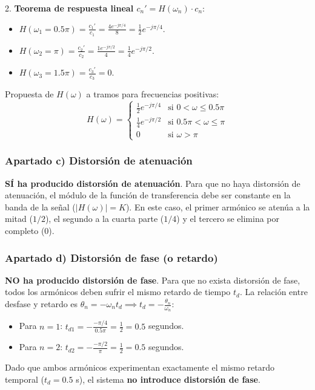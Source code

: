 \begin{resolucion}
2. \textbf{Teorema de respuesta lineal $c_n' = H(\omega_n) \cdot c_n$}:
   \begin{itemize}
       \item $H(\omega_1 = 0.5\pi) = \frac{c_1'}{c_1} = \frac{4 e^{-j\pi/4}}{8} = \frac{1}{2} e^{-j\pi/4}$.
       \item $H(\omega_2 = \pi) = \frac{c_2'}{c_2} = \frac{1 e^{-j\pi/2}}{4} = \frac{1}{4} e^{-j\pi/2}$.
       \item $H(\omega_3 = 1.5\pi) = \frac{c_3'}{c_3} = 0$.
   \end{itemize}

Propuesta de $H(\omega)$ a tramos para frecuencias positivas:
\[
H(\omega) = \begin{cases} 
\frac{1}{2} e^{-j\pi/4} & \text{si } 0 < \omega \le 0.5\pi \\
\frac{1}{4} e^{-j\pi/2} & \text{si } 0.5\pi < \omega \le \pi \\
0 & \text{si } \omega > \pi 
\end{cases}
\]
\vspace{1cm}
\subsubsection*{Apartado c) Distorsión de atenuación}

\textbf{SÍ ha producido distorsión de atenuación}. 
Para que no haya distorsión de atenuación, el módulo de la función de transferencia debe ser constante en la banda de la señal ($|H(\omega)| = K$). En este caso, el primer armónico se atenúa a la mitad ($1/2$), el segundo a la cuarta parte ($1/4$) y el tercero se elimina por completo ($0$).
\vspace{1cm}
\subsubsection*{Apartado d) Distorsión de fase (o retardo)}

\textbf{NO ha producido distorsión de fase}.
Para que no exista distorsión de fase, todos los armónicos deben sufrir el mismo retardo de tiempo $t_d$. La relación entre desfase y retardo es $\theta_n = -\omega_n t_d \implies t_d = -\frac{\theta_n}{\omega_n}$:
\begin{itemize}
    \item Para $n=1$: $t_{d1} = -\frac{-\pi/4}{0.5\pi} = \frac{1}{2} = 0.5$ segundos.
    \item Para $n=2$: $t_{d2} = -\frac{-\pi/2}{\pi} = \frac{1}{2} = 0.5$ segundos.
\end{itemize}
Dado que ambos armónicos experimentan exactamente el mismo retardo temporal ($t_d = 0.5$ s), el sistema \textbf{no introduce distorsión de fase}.


\end{resolucion}
